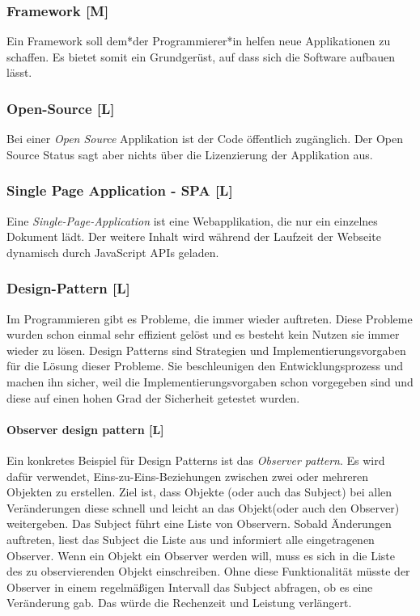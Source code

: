 \subsubsection{Framework [M]}
\label{txt:glos:Framework}

Ein Framework soll dem*der Programmierer*in helfen neue Applikationen zu schaffen. Es bietet somit ein Grundgerüst, auf dass sich die Software aufbauen lässt. \cite{Framework}  

\subsubsection{Open-Source [L]}
Bei einer \emph{Open Source} Applikation ist der Code öffentlich zugänglich. Der Open Source Status sagt aber nichts über die Lizenzierung der Applikation aus. \cite{WhatOpenSource}

\subsubsection{Single Page Application - SPA [L]}
\label{glos:spa}
Eine \emph{Single-Page-Application} ist eine Webapplikation, die nur ein einzelnes Dokument lädt. Der weitere Inhalt wird während der Laufzeit der Webseite dynamisch durch JavaScript APIs geladen. \cite{WhatSPA}


\subsubsection{Design-Pattern [L]}
\label{glos:pattern}
Im Programmieren gibt es Probleme, die immer wieder auftreten. Diese Probleme wurden schon einmal sehr effizient gelöst und es besteht kein Nutzen sie immer wieder zu lösen. Design Patterns sind Strategien und Implementierungsvorgaben für die Lösung dieser Probleme. Sie beschleunigen den Entwicklungsprozess und machen ihn sicher, weil die Implementierungsvorgaben schon vorgegeben sind und diese auf einen hohen Grad der Sicherheit getestet wurden. \cite{DesignPatterns}

\paragraph{Observer design pattern [L]}
\label{txt:glos:observerDesignPattern}
Ein konkretes Beispiel für Design Patterns ist das \emph{Observer pattern}. Es wird dafür verwendet, Eins-zu-Eins-Beziehungen zwischen zwei oder mehreren Objekten zu erstellen. Ziel ist, dass Objekte (oder auch das Subject) bei allen Veränderungen diese schnell und leicht an das Objekt(oder auch den Observer) weitergeben.  Das Subject führt eine Liste von Observern. Sobald Änderungen auftreten, liest das Subject die Liste aus und informiert alle eingetragenen Observer. Wenn ein Objekt ein Observer werden will, muss es sich in die Liste des zu observierenden Objekt einschreiben. Ohne diese Funktionalität müsste der Observer in einem regelmäßigen Intervall das Subject abfragen, ob es eine Veränderung gab. Das würde die Rechenzeit und Leistung verlängert. \cite{ObserverPatternExplaination}

